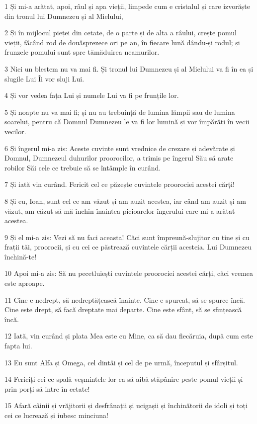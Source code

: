 \par 1 Și mi-a arătat, apoi, râul și apa vieții, limpede cum e cristalul și care izvorăște din tronul lui Dumnezeu și al Mielului,
\par 2 Și în mijlocul pieței din cetate, de o parte și de alta a râului, crește pomul vieții, făcând rod de douăsprezece ori pe an, în fiecare lună dându-și rodul; și frunzele pomului sunt spre tămăduirea neamurilor.
\par 3 Nici un blestem nu va mai fi. Și tronul lui Dumnezeu și al Mielului va fi în ea și slugile Lui Îi vor sluji Lui.
\par 4 Și vor vedea fața Lui și numele Lui va fi pe frunțile lor.
\par 5 Și noapte nu va mai fi; și nu au trebuință de lumina lămpii sau de lumina soarelui, pentru că Domnul Dumnezeu le va fi lor lumină și vor împărăți în vecii vecilor.
\par 6 Și îngerul mi-a zis: Aceste cuvinte sunt vrednice de crezare și adevărate și Domnul, Dumnezeul duhurilor proorocilor, a trimis pe îngerul Său să arate robilor Săi cele ce trebuie să se întâmple în curând.
\par 7 Și iată vin curând. Fericit cel ce păzește cuvintele proorociei acestei cărți!
\par 8 Și eu, Ioan, sunt cel ce am văzut și am auzit acestea, iar când am auzit și am văzut, am căzut să mă închin înaintea picioarelor îngerului care mi-a arătat acestea.
\par 9 Și el mi-a zis: Vezi să nu faci aceasta! Căci sunt împreună-slujitor cu tine și cu frații tăi, proorocii, și cu cei ce păstrează cuvintele cărții acesteia. Lui Dumnezeu închină-te!
\par 10 Apoi mi-a zis: Să nu pecetluiești cuvintele proorociei acestei cărți, căci vremea este aproape.
\par 11 Cine e nedrept, să nedreptățească înainte. Cine e spurcat, să se spurce încă. Cine este drept, să facă dreptate mai departe. Cine este sfânt, să se sfințească încă.
\par 12 Iată, vin curând și plata Mea este cu Mine, ca să dau fiecăruia, după cum este fapta lui.
\par 13 Eu sunt Alfa și Omega, cel dintâi și cel de pe urmă, începutul și sfârșitul.
\par 14 Fericiți cei ce spală veșmintele lor ca să aibă stăpânire peste pomul vieții și prin porți să intre în cetate!
\par 15 Afară câinii și vrăjitorii și desfrânații și ucigașii și închinătorii de idoli și toți cei ce lucrează și iubesc minciuna!
